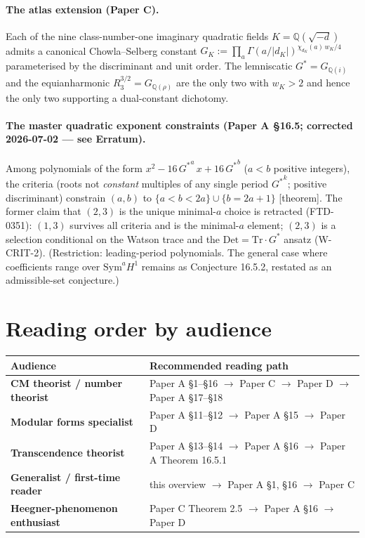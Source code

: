 \documentclass[11pt]{amsart}
\newcommand{\Gs}{G^{*}}
\newcommand{\GK}{G_{K}}
\newcommand{\Q}{\mathbb{Q}}
\begin{document}
\paragraph{The atlas extension (Paper C).} Each of the nine
class-number-one imaginary quadratic fields $K = \Q(\sqrt{-d})$ admits a
canonical Chowla--Selberg constant
$\GK := \prod_{a} \Gamma(a/|d_K|)^{\chi_{d_K}(a)\,w_K/4}$
parameterised by the discriminant and unit order. The lemniscatic
$\Gs = G_{\Q(i)}$ and the equianharmonic $R_{3}^{3/2} = G_{\Q(\rho)}$
are the only two with $w_K > 2$ and hence the only two supporting a
dual-constant dichotomy.

\paragraph{The master quadratic exponent constraints (Paper A \S 16.5;
corrected 2026-07-02 --- see Erratum).}
Among polynomials of the form $x^{2} - 16\,{\Gs}^{a}\,x + 16\,{\Gs}^{b}$
($a < b$ positive integers), the criteria (roots not \emph{constant}
multiples of any single period ${\Gs}^{k}$; positive discriminant)
constrain $(a,b)$ to $\{a < b < 2a\} \cup \{b = 2a+1\}$ [theorem]. The
former claim that $(2,3)$ is the unique minimal-$a$ choice is retracted
(FTD-0351): $(1,3)$ survives all criteria and is the minimal-$a$ element;
$(2,3)$ is a selection conditional on the Watson trace and the
$\mathrm{Det}=\mathrm{Tr}\cdot{\Gs}$ ansatz (W-CRIT-2). (Restriction:
leading-period polynomials. The general case where coefficients range
over $\mathrm{Sym}^{a}H^{1}$ remains as Conjecture 16.5.2, restated as an
admissible-set conjecture.)

\section{Reading order by audience}

\begin{center}
\renewcommand{\arraystretch}{1.25}
\begin{tabular}{>{\bfseries}l l}
\toprule
Audience & Recommended reading path \\
\midrule
CM theorist / number theorist & Paper A \S 1--\S 16 $\to$ Paper C $\to$ Paper D $\to$ Paper A \S 17--\S 18 \\
Modular forms specialist & Paper A \S 11--\S 12 $\to$ Paper A \S 15 $\to$ Paper D \\
Transcendence theorist & Paper A \S 13--\S 14 $\to$ Paper A \S 16 $\to$ Paper A Theorem 16.5.1 \\
Generalist / first-time reader & this overview $\to$ Paper A \S 1, \S 16 $\to$ Paper C \\
Heegner-phenomenon enthusiast & Paper C Theorem 2.5 $\to$ Paper A \S 16 $\to$ Paper D \\
\bottomrule
\end{tabular}
\end{center}
\end{document}
